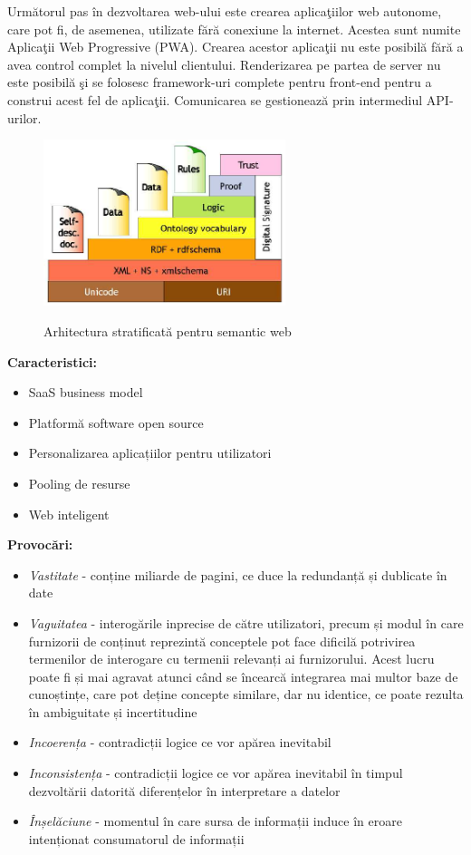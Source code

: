 \documentclass[12pt, a4paper]{report}
\begin{document}
Urm\u atorul pas \^ in dezvoltarea web-ului este crearea aplica\c tiilor web autonome, care pot fi, de asemenea, utilizate f\u ar\u a conexiune la internet. Acestea sunt numite Aplica\c tii Web Progressive (PWA). Crearea acestor aplica\c tii nu este posibil\u a f\u ar\u a a avea control complet la nivelul clientului. Renderizarea pe partea de server nu este posibil\u a \c si se folosesc framework-uri complete pentru front-end pentru a construi acest fel de aplica\c tii. Comunicarea se gestioneaz\u a prin intermediul API-urilor.\cite{pwa}


\begin{figure}[htbp]
	\centering
	\includegraphics[width=0.63\textwidth]{layered_architecture.png} \label{fig:layered}
	\caption{Arhitectura stratificată pentru semantic web}
\end{figure}



\textbf{Caracteristici:}
\begin{itemize}
	\item SaaS business model
	\item Platformă software open source
	\item Personalizarea aplicațiilor pentru utilizatori
	\item Pooling de resurse
	\item Web inteligent
\end{itemize}


\textbf{Provocări:}
\begin{itemize}
	\item \emph{Vastitate} - conține miliarde de pagini, ce duce la redundanță și dublicate în date
	\item \emph{Vaguitatea} - interogările inprecise de către utilizatori, precum și modul în care furnizorii de conținut reprezintă conceptele pot face dificilă potrivirea termenilor de interogare cu termenii relevanți ai furnizorului. Acest lucru poate fi și mai agravat atunci când se încearcă integrarea mai multor baze de cunoștințe, care pot deține concepte similare, dar nu identice, ce poate rezulta în ambiguitate și incertitudine
	\item \emph{Incoerența} - contradicții logice ce vor apărea inevitabil
	\item \emph{Inconsistența} - contradicții logice ce vor apărea inevitabil în timpul dezvoltării datorită diferențelor în interpretare a datelor
	\item \emph{Înșelăciune} - momentul în care sursa de informații induce în eroare intenționat consumatorul de informații
\end{itemize}
\end{document}
